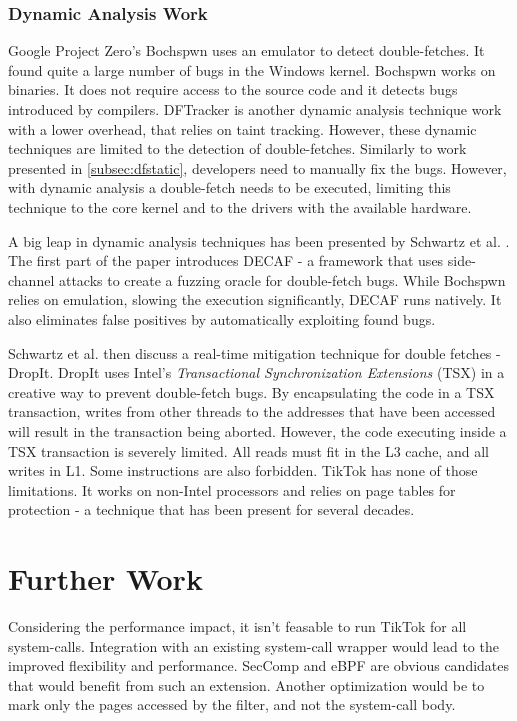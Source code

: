 \subsubsection{Dynamic Analysis Work}
Google Project Zero's Bochspwn \cite{jurczyk2013bochspwn} uses an emulator to
detect double-fetches. It found quite a large number of bugs in the Windows
kernel. Bochspwn works on binaries. It does not require access to the source
code and it detects bugs introduced by compilers.
DFTracker\cite{wang2019dftracker} is another dynamic analysis technique work
with a lower overhead, that relies on taint tracking. However, these dynamic
techniques are limited to the detection of double-fetches. Similarly to work
presented in \cref{subsec:dfstatic}, developers need to manually fix the bugs.
However, with dynamic analysis a double-fetch needs to be executed, limiting
this technique to the core kernel and to the drivers with the available
hardware.

A big leap in dynamic analysis techniques has been presented by Schwartz et al.
\cite{schwarz2018automated}. The first part of the paper introduces DECAF - a
framework that uses side-channel attacks to create a fuzzing oracle for
double-fetch bugs. While Bochspwn relies on emulation, slowing the execution
significantly, DECAF runs natively. It also eliminates false positives by
automatically exploiting found bugs.

Schwartz et al. then discuss a real-time mitigation technique for double
fetches - DropIt. DropIt uses Intel's \emph{Transactional Synchronization 
Extensions} (TSX)\cite{intel64and} in a creative way to prevent double-fetch
bugs. By encapsulating the code in a TSX transaction, writes from other threads
to the addresses that have been accessed will result in the
transaction being aborted. However, the code executing inside a TSX transaction
is severely limited. All reads must fit in the L3 cache, and all writes in L1.
Some instructions are also forbidden. TikTok has none of those limitations.
It works on non-Intel processors and relies on page tables for protection - a
technique that has been present for several decades.

\section{Further Work}

Considering the performance impact, it isn't feasable to run TikTok for all
system-calls. Integration with an existing system-call wrapper would lead to the
improved flexibility and performance. SecComp\cite{seccomp} and eBPF\cite{ebpf}
are obvious candidates that would benefit from such an extension. Another
optimization would be to mark only the pages accessed by the filter, and not the
system-call body.

